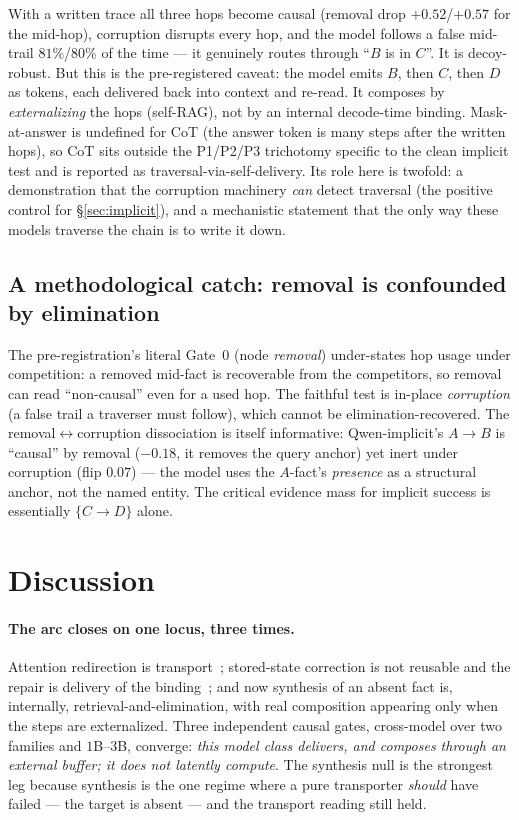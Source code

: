 \documentclass[11pt]{article}
\begin{document}
With a written trace all three hops become causal (removal drop $+0.52$/$+0.57$ for the
mid-hop), corruption disrupts every hop, and the model follows a false mid-trail
$81\%$/$80\%$ of the time --- it genuinely routes through ``$B$ is in $C$''. It is
decoy-robust. But this is the pre-registered caveat: the model emits $B$, then $C$,
then $D$ as tokens, each delivered back into context and re-read. It composes by
\emph{externalizing} the hops (self-RAG), not by an internal decode-time binding.
Mask-at-answer is undefined for CoT (the answer token is many steps after the written
hops), so CoT sits outside the P1/P2/P3 trichotomy specific to the clean implicit test
and is reported as traversal-via-self-delivery. Its role here is twofold: a
demonstration that the corruption machinery \emph{can} detect traversal (the positive
control for \S\ref{sec:implicit}), and a mechanistic statement that the only way these
models traverse the chain is to write it down.

\subsection{A methodological catch: removal is confounded by elimination}
\label{sec:catch}

The pre-registration's literal Gate~0 (node \emph{removal}) under-states hop usage
under competition: a removed mid-fact is recoverable from the competitors, so removal
can read ``non-causal'' even for a used hop. The faithful test is in-place
\emph{corruption} (a false trail a traverser must follow), which cannot be
elimination-recovered. The removal$\leftrightarrow$corruption dissociation is itself
informative: Qwen-implicit's $A\!\to\!B$ is ``causal'' by removal ($-0.18$, it removes
the query anchor) yet inert under corruption (flip $0.07$) --- the model uses the
$A$-fact's \emph{presence} as a structural anchor, not the named entity. The critical
evidence mass for implicit success is essentially $\{C\!\to\!D\}$ alone.

\section{Discussion}
\label{sec:discuss}

\paragraph{The arc closes on one locus, three times.}
Attention redirection is transport~\cite{paper3retention}; stored-state correction is
not reusable and the repair is delivery of the binding~\cite{paper4arc}; and now
synthesis of an absent fact is, internally, retrieval-and-elimination, with real
composition appearing only when the steps are externalized. Three independent causal
gates, cross-model over two families and $1$B--$3$B, converge: \emph{this model class
delivers, and composes through an external buffer; it does not latently compute}. The
synthesis null is the strongest leg because synthesis is the one regime where a pure
transporter \emph{should} have failed --- the target is absent --- and the transport
reading still held.
\end{document}
